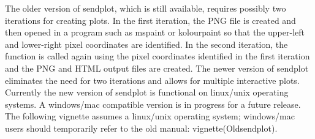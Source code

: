 \documentclass[]{article}
\begin{document}


\vskip5mm
 The older version of sendplot, which is still available, requires possibly two iterations for creating plots. In the first iteration, the PNG file is created and then opened in a program such as mspaint or kolourpaint so that the upper-left and lower-right pixel coordinates are identified. In the second iteration, the function is called again using the pixel coordinates identified in the first iteration and the PNG and HTML output files are created. The newer version of sendplot eliminates the need for two iterations and allows for multiple interactive plots. Currently the new version of sendplot is functional on linux/unix operating systems. A windows/mac compatible version is in progress for a future release. The following vignette assumes a linux/unix operating system; windows/mac users should temporarily refer to the old manual: vignette(Oldsendplot). \newline


\end{document}
